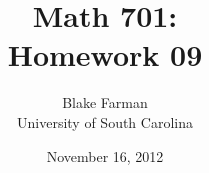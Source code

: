 \documentclass[10pt]{amsart}
\author{Blake Farman\\University of South Carolina}
\title{Math 701:\\Homework 09}
\date{November 16, 2012}
\begin{document}
\maketitle

\newcommand{\Z}{\mathbb{Z}}
\newcommand{\R}{\mathbb{R}}
\newcommand{\Q}{\mathbb{Q}}
\newcommand{\C}{\mathbb{C}}
\newcommand{\F}{\mathbb{F}}
\newcommand{\N}{\mathbb{N}}
\newcommand{\uhp}{\mathfrak{h}}
\newcommand{\quat}{\mathbb{H}}

\newcommand{\ord}{\operatorname{ord}}
\newcommand{\Det}{\operatorname{Det}}
\newcommand{\Gal}{\operatorname{Gal}}
\newcommand{\Inn}[1]{\operatorname{Inn}\left(#1\right)}
\newcommand{\Aut}[1]{\operatorname{Aut}\left(#1\right)}
\newcommand{\real}[1]{\operatorname{\mathfrak{Re}}\left(#1\right)}
\newcommand{\imag}[1]{\operatorname{\mathfrak{Im}}\left(#1\right)}
\newcommand{\Syl}[2]{\operatorname{Syl}_{#1}\left(#2\right)}
\newcommand{\SL}[2]{\operatorname{SL}_#1\left(#2\right)}
\newcommand{\GL}[2]{\operatorname{GL}_#1\left(#2\right)}
\newcommand{\M}[2]{\operatorname{M}_#1\left(#2\right)}
\newcommand{\PSL}[2]{\operatorname{PSL}_#1\left(#2\right)}
\newcommand{\Mat}[2]{\operatorname{Mat}_{#1}\left(#2\right)}
\providecommand{\norm}[1]{\lVert#1\rVert}
\newcommand{\dist}[2]{\operatorname{dist}\left(#1,#2\right)}
\newcommand{\cntr}[1]{\mathbf{Z}\left(#1\right)}
\newcommand{\abs}[1]{\left| #1 \right|}
\newcommand{\orbit}[1]{\mathcal{O}_{#1}}
\newcommand{\card}[1]{\operatorname{card}#1}

\renewcommand{\qedsymbol}{\(\blacksquare\)}
\renewcommand{\epsilon}{\varepsilon}

\newtheorem{thm}{}
\newtheorem{lem}{Lemma}
\end{document}
